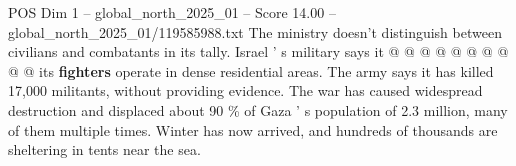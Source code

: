 \begin{textsample}{POS Dim 1 – global\_north\_2025\_01 – Score 14.00 – global\_north\_2025\_01/119585988.txt}
The ministry doesn't distinguish between civilians and combatants in its tally.
Israel ' s military says it @ @ @ @ @ @ @ @ @ @ its \textbf{fighters} operate in dense residential areas.
The army says it has killed 17,000 militants, without providing evidence.
The war has caused widespread destruction and displaced about 90 \% of Gaza ' s population of 2.3 million, many of them multiple times.
Winter has now arrived, and hundreds of thousands are sheltering in tents near the sea.

\end{textsample}
